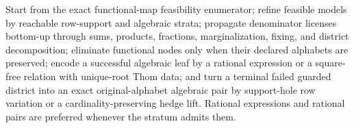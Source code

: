 Start from the exact functional-map feasibility enumerator; refine feasible models by reachable row-support and algebraic strata; propagate denominator licenses bottom-up through sums, products, fractions, marginalization, fixing, and district decomposition; eliminate functional nodes only when their declared alphabets are preserved; encode a successful algebraic leaf by a rational expression or a square-free relation with unique-root Thom data; and turn a terminal failed guarded district into an exact original-alphabet algebraic pair by support-hole row variation or a cardinality-preserving hedge lift. Rational expressions and rational pairs are preferred whenever the stratum admits them.